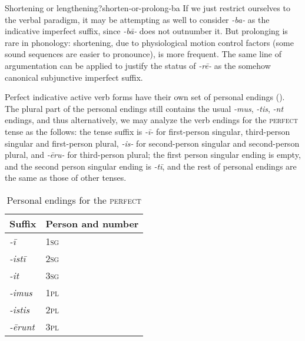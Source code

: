 \documentclass[a4paper, oneside, 12pt]{report}
\newcommand{\form}[1]{\emph{#1}}
\newcommand*{\category}[1]{\textsc{#1}}
\begin{document}
\begin{infobox}{Shortening or lengthening?}{shorten-or-prolong-ba}
    If we just restrict ourselves to the verbal paradigm, 
    it may be attempting as well to consider \form{-ba-} as 
    the indicative imperfect suffix,
    since \form{-b\={a}-} does not outnumber it.
    But prolonging is rare in phonology:
    shortening, due to physiological motion control factors
    (some sound sequences are easier to pronounce), 
    is more frequent.
    The same line of argumentation can be applied to justify the status of \form{-r\={e}-}
    as the somehow canonical subjunctive imperfect suffix.
\end{infobox}

Perfect indicative active verb forms have their own set of personal endings
().
The plural part of the personal endings still contains 
the usual \form{-mus}, \form{-tis}, \form{-nt} endings, 
and thus alternatively, we may analyze the verb endings for the \category{perfect} tense 
as the follows: 
the tense suffix is \form{-ī-}
for first-person singular, third-person singular and first-person plural,
\form{-is-} for second-person singular and second-person plural,
and \form{-\={e}ru-} for third-person plural;
the first person singular ending is empty,
and the second person singular ending is \form{-tī},
and the rest of personal endings are the same as those of other tenses.

\begin{table}[H]
    \centering
    \caption{Personal endings for the \category{perfect}}
    \label{tbl:personal-ending-perfect}
    \begin{tabular}{ll}
        \toprule
        Suffix & Person and number \\
        \midrule
        \form{-ī    } & \category{1sg} \\
        \form{-istī } & \category{2sg} \\
        \form{-it   } & \category{3sg} \\
        \form{-imus } & \category{1pl} \\
        \form{-istis} & \category{2pl} \\
        \form{-\={e}runt} & \category{3pl} \\ 
        \bottomrule
    \end{tabular}
\end{table}
\end{document}
